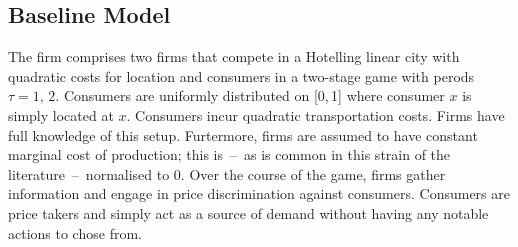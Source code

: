 \documentclass[a4paper, 11 pt, fleqn]{article}
\begin{document}
\subsection{Baseline Model} \label{sec:choe-baseline} %
The firm comprises two firms that compete in a Hotelling linear city with quadratic costs for location and consumers in a two-stage game
with perods $\tau = 1,\,2$. Consumers are uniformly distributed on [0,\,1] where consumer $x$ is simply located at $x$.
Consumers incur quadratic transportation costs. Firms have full knowledge of this setup. Furtermore, firms are assumed to have constant
marginal cost of production; this is~--~as is common in this strain of the literature~--~normalised to 0. Over the course of the game,
firms gather information and engage in price discrimination against consumers. Consumers are price takers and simply act as a source of
demand without having any notable actions to chose from.
%
\end{document}
